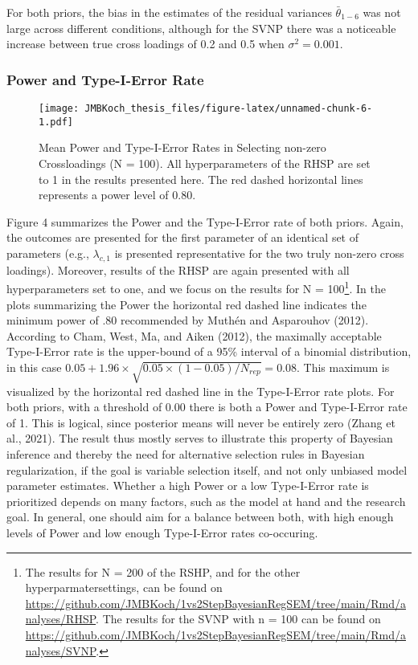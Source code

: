 \documentclass[
  man, donotrepeattitle,floatsintext]{apa6}
\begin{document}
For both priors, the bias in the estimates of the residual variances
\(\bar{\theta}_{1-6}\) was not large across different conditions, although
for the SVNP there was a noticeable increase between true cross loadings
of 0.2 and 0.5 when \(\sigma^2 = 0.001\).

\hypertarget{power-and-type-i-error-rate-1}{%
\subsubsection{Power and Type-I-Error Rate}\label{power-and-type-i-error-rate-1}}

\begin{figure}
\centering
\texttt{[image: JMBKoch\_thesis\_files/figure-latex/unnamed-chunk-6-1.pdf]}
\caption{\label{fig:unnamed-chunk-6}Mean Power and Type-I-Error Rates in Selecting non-zero Crossloadings (N = 100). All hyperparameters of the RHSP are set to 1 in the results presented here. The red dashed horizontal lines represents a power level of 0.80.}
\end{figure}

Figure 4 summarizes the Power and the Type-I-Error rate of both priors.
Again, the outcomes are presented for the first parameter of an
identical set of parameters (e.g., \(\lambda_{c,1}\) is presented
representative for the two truly non-zero cross loadings). Moreover, results of the RHSP are again presented with all hyperparameters set to
one, and we focus on the results for N = 100\footnote{The results for N = 200 of the RSHP, and for the other hyperparmatersettings, can be found on \url{https://github.com/JMBKoch/1vs2StepBayesianRegSEM/tree/main/Rmd/analyses/RHSP}. The results for the SVNP with n = 100 can be found on \url{https://github.com/JMBKoch/1vs2StepBayesianRegSEM/tree/main/Rmd/analyses/SVNP}.}. In the plots summarizing the Power the horizontal red dashed line
indicates the minimum power of .80 recommended by Muthén and Asparouhov (2012).
According to Cham, West, Ma, and Aiken (2012), the maximally acceptable
Type-I-Error rate is the upper-bound of a 95\% interval of a binomial
distribution, in this case
\(0.05 + 1.96 \times \sqrt{0.05 \times (1-0.05)/ N_{rep}} = 0.08\). This
maximum is visualized by the horizontal red dashed line in the
Type-I-Error rate plots. For both priors, with a threshold of 0.00 there
is both a Power and Type-I-Error rate of 1. This is logical, since
posterior means will never be entirely zero (Zhang et al., 2021). The
result thus mostly serves to illustrate this property of Bayesian
inference and thereby the need for alternative selection rules in
Bayesian regularization, if the goal is variable selection itself, and
not only unbiased model parameter estimates. Whether a high Power or a
low Type-I-Error rate is prioritized depends on many factors, such as
the model at hand and the research goal. In general, one should aim for
a balance between both, with high enough levels of Power and low enough
Type-I-Error rates co-occuring.
\end{document}
